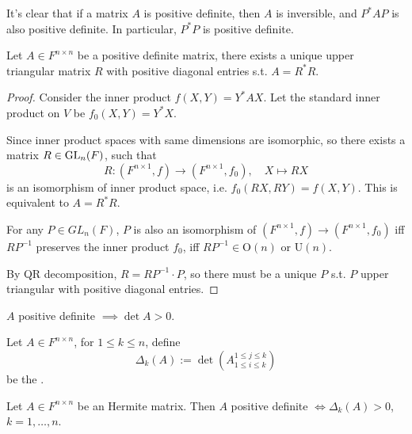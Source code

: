 It's clear that if a matrix $A$ is positive definite, then $A$ is inversible,
and $P^*AP$ is also positive definite.
In particular, $P^*P$ is positive definite.
\begin{theorem}
    Let $A\in F^{n\times n}$ be a positive definite matrix, there exists
	a unique upper triangular matrix $R$ with positive diagonal entries
	s.t. $A = R^*R$.
\end{theorem}
\begin{proof}[Proof]
    Consider the inner product $f(X, Y) = Y^*AX$.
	Let the standard inner product on $V$ be $f_0(X, Y) = Y^*X$.

	Since inner product spaces with same dimensions are isomorphic,
	so there exists a matrix $R\in \mathrm{GL}_n(F)$, such that
	\[
		R: (F^{n\times 1}, f)\to (F^{n\times 1}, f_0),\quad X\mapsto RX
	\]
	is an isomorphism of inner product space, i.e. $f_0(RX, RY) = f(X, Y)$.
	This is equivalent to $A = R^*R$.

	For any $P\in GL_n(F)$, $P$ is also an isomorphism of $(F^{n\times 1}, f) \to
	(F^{n\times 1}, f_0)$ iff $RP^{-1}$ preserves the inner product $f_0$,
	iff $RP^{-1}\in \mathrm{O}(n)$ or $\mathrm{U}(n)$.

	By QR decomposition, $R = RP^{-1} \cdot P$, so there must be a unique $P$ s.t.
	$P$ upper triangular with positive diagonal entries.
\end{proof}
\begin{corollary}
    $A$ positive definite $ \implies \det A > 0$.
\end{corollary}

\begin{definition}
	Let $A\in F^{n\times n}$, for $1\le k \le n$, define
	\[
	\Delta_k(A) := \det (A_{1\le i\le k}^{1\le j\le k})
	\]
	be the .
\end{definition}
\begin{theorem}
    Let $A\in F^{n\times n}$ be an Hermite matrix.
	Then $A$ positive definite $\iff \Delta_k(A) > 0$, $k = 1,\dots, n$.
\end{theorem}

